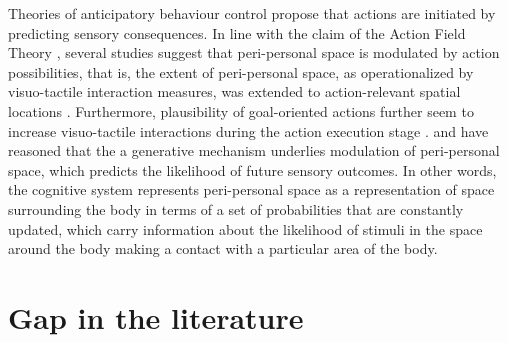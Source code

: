 Theories of anticipatory behaviour control propose that actions are initiated by predicting sensory consequences. In line with the claim of the Action Field Theory \cite{bufacchi2021peripersonal}, several studies suggest that peri-personal space is modulated by action possibilities, that is, the extent of peri-personal space, as operationalized by visuo-tactile interaction measures, was extended to action-relevant spatial locations \cite{lohmann2019hands, iriki1996coding}. Furthermore, plausibility of goal-oriented actions further seem to increase visuo-tactile interactions during the action execution stage \cite{senna2019aim}.  and  have reasoned that the a generative mechanism underlies modulation of peri-personal space, which predicts the likelihood of future sensory outcomes. In other words, the cognitive system represents peri-personal space as a representation of space surrounding the body in terms of a set of probabilities that are constantly updated, which carry information about the likelihood of stimuli in the space around the body making a contact with a particular area of the body.



\section{Gap in the literature}

